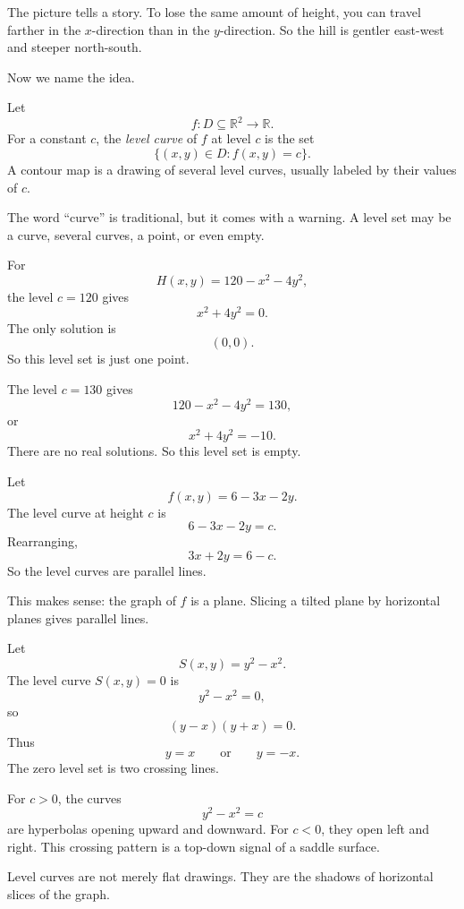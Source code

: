 The picture tells a story.  To lose the same amount of height, you can travel farther in
the \(x\)-direction than in the \(y\)-direction.  So the hill is gentler east-west and
steeper north-south.

Now we name the idea.

\begin{definition}
Let
\[
    f:D\subseteq\mathbb R^2\to\mathbb R.
\]
For a constant \(c\), the \emph{level curve} of \(f\) at level \(c\) is the set
\[
\boxed{
    \{(x,y)\in D:f(x,y)=c\}.
}
\]
A contour map is a drawing of several level curves, usually labeled by their values of
\(c\).
\end{definition}

The word ``curve'' is traditional, but it comes with a warning.  A level set may be a
curve, several curves, a point, or even empty.

\begin{example}
For
\[
    H(x,y)=120-x^2-4y^2,
\]
the level \(c=120\) gives
\[
    x^2+4y^2=0.
\]
The only solution is
\[
    (0,0).
\]
So this level set is just one point.

The level \(c=130\) gives
\[
    120-x^2-4y^2=130,
\]
or
\[
    x^2+4y^2=-10.
\]
There are no real solutions.  So this level set is empty.
\end{example}

\begin{example}
Let
\[
    f(x,y)=6-3x-2y.
\]
The level curve at height \(c\) is
\[
    6-3x-2y=c.
\]
Rearranging,
\[
    3x+2y=6-c.
\]
So the level curves are parallel lines.

This makes sense: the graph of \(f\) is a plane.  Slicing a tilted plane by horizontal
planes gives parallel lines.
\end{example}

\begin{example}
Let
\[
    S(x,y)=y^2-x^2.
\]
The level curve \(S(x,y)=0\) is
\[
    y^2-x^2=0,
\]
so
\[
    (y-x)(y+x)=0.
\]
Thus
\[
    y=x
    \qquad\text{or}\qquad
    y=-x.
\]
The zero level set is two crossing lines.

For \(c>0\), the curves
\[
    y^2-x^2=c
\]
are hyperbolas opening upward and downward.  For \(c<0\), they open left and right.
This crossing pattern is a top-down signal of a saddle surface.
\end{example}

Level curves are not merely flat drawings.  They are the shadows of horizontal slices
of the graph.

